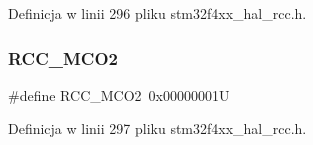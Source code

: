 Definicja w linii 296 pliku stm32f4xx\+\_\+hal\+\_\+rcc.\+h.

\mbox{\label{group___r_c_c___m_c_o___index_ga248f59fc2868f83bea4f2d182edcdf4c}} 
\subsubsection{\texorpdfstring{R\+C\+C\+\_\+\+M\+C\+O2}{RCC\_MCO2}}
{\footnotesize\ttfamily \#define R\+C\+C\+\_\+\+M\+C\+O2~0x00000001U}



Definicja w linii 297 pliku stm32f4xx\+\_\+hal\+\_\+rcc.\+h.

